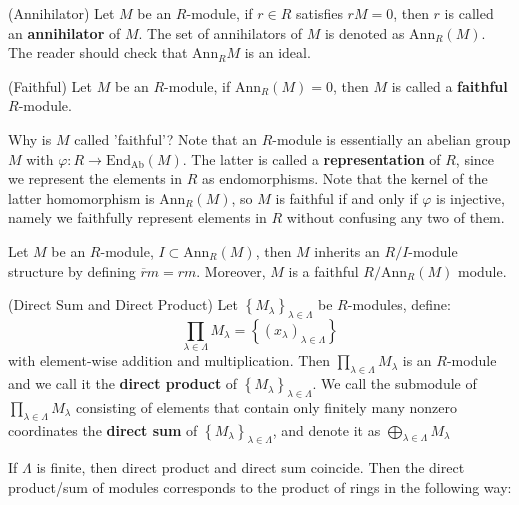 \documentclass{note-eng}
\begin{document}
\begin{definition}
    (Annihilator) Let $M$ be an $R$-module, if $r \in R$ satisfies $rM = 0$, then $r$ is called an \textbf{annihilator} of $M$. The set of annihilators of $M$ is denoted as $\mathrm{Ann}_R(M)$. The reader should check that $\mathrm{Ann}_R{M}$ is an ideal.
\end{definition}

\begin{definition}
    (Faithful) Let $M$ be an $R$-module, if $\mathrm{Ann}_R(M) = 0$, then $M$ is called a \textbf{faithful} $R$-module.
\end{definition}

Why is $M$ called 'faithful'? Note that an $R$-module is essentially an abelian group $M$ with $\varphi: R \rightarrow \mathrm{End}_{\mathrm{Ab}}(M)$. The latter is called a \textbf{representation} of $R$, since we represent the elements in $R$ as endomorphisms. Note that the kernel of the latter homomorphism is $\mathrm{Ann}_R(M)$, so $M$ is faithful if and only if $\varphi$ is injective, namely we faithfully represent elements in $R$ without confusing any two of them.

\begin{proposition}
    Let $M$ be an $R$-module, $I \subset \mathrm{Ann}_R(M)$, then $M$ inherits an $R / I$-module structure by defining $\overline{r} m = rm$. Moreover, $M$ is a faithful $R / \mathrm{Ann}_R(M)$ module.
\end{proposition}

\begin{definition}
    (Direct Sum and Direct Product) Let $\left\lbrace M_{\lambda} \right\rbrace_{\lambda \in \Lambda}$ be $R$-modules, define:
    $$\prod\limits_{\lambda \in \Lambda} M_{\lambda} = \left\lbrace (x_{\lambda})_{\lambda \in \Lambda} \right\rbrace$$
    with element-wise addition and multiplication. Then $\prod\limits_{\lambda \in \Lambda} M_{\lambda}$ is an $R$-module and we call it the \textbf{direct product} of $\left\lbrace M_{\lambda} \right\rbrace_{\lambda \in \Lambda}$. We call the submodule of $\prod\limits_{\lambda \in \Lambda} M_\lambda$ consisting of elements that contain only finitely many nonzero coordinates the \textbf{direct sum} of $\left\lbrace M_{\lambda} \right\rbrace_{\lambda \in \Lambda}$, and denote it as $\bigoplus\limits_{\lambda \in \Lambda} M_{\lambda}$
\end{definition}

If $\Lambda$ is finite, then direct product and direct sum coincide. Then the direct product/sum of modules corresponds to the product of rings in the following way:
\end{document}
